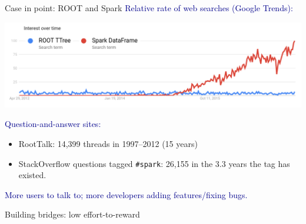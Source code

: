 \documentclass{beamer}
\begin{document}
\begin{frame}{Case in point: ROOT and Spark}
\vfill
\textcolor{darkblue}{Relative rate of web searches (Google Trends):}

\includegraphics[width=\linewidth]{root-spark-google-trends.png}

\vfill
\textcolor{darkblue}{Question-and-answer sites:}
\begin{itemize}
\item RootTalk: 14,399 threads in 1997--2012 (15 years)
\item StackOverflow questions tagged {\tt \small \#spark}: 26,155 in the 3.3 years the tag has existed.
\end{itemize}

\vfill
\textcolor{darkblue}{More users to talk to; more developers adding features/fixing bugs.}
\end{frame}

\begin{frame}{Building bridges: low effort-to-reward}
\vspace{0.5 cm}
\begin{center}
\hspace{1 cm}
\end{center}
\end{frame}
\end{document}
